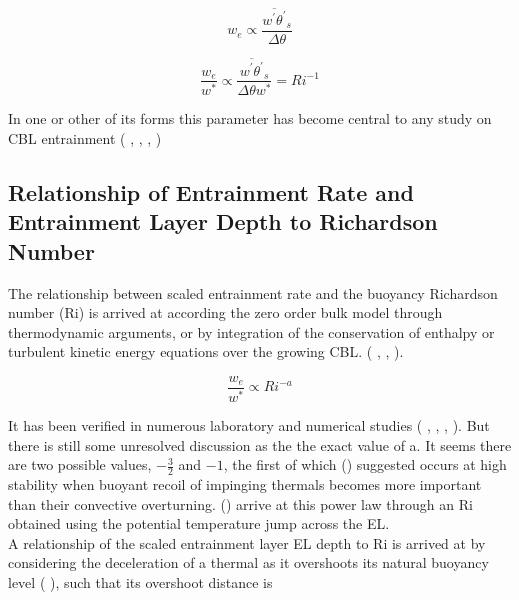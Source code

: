 \begin{equation}
w_{e} \propto \frac{\overline{w^{'}\theta^{'}}_{s}}{\Delta \theta}
\end{equation}

\begin{equation}
\frac{w_{e}}{w^{*}} \propto  \frac{\overline{w^{'}\theta^{'}}_{s}}{\Delta \theta w^{*}} = Ri^{-1}
\end{equation}
 

In one or other of its forms this parameter has become central to any study on \acs{CBL} entrainment (\citeauthor{SullMoengStev} \cite{SullMoengStev}, \citeauthor{FedConzMir04} \cite{FedConzMir04}, \citeauthor{Traum11} \cite{Traum11}, \citeauthor{BrooksFowler2} \cite{BrooksFowler2})


\subsection{Relationship of Entrainment Rate and Entrainment Layer Depth to Richardson Number}

The relationship between scaled entrainment rate and the buoyancy Richardson number (\acs{Ri}) is arrived at according the zero order bulk
model through thermodynamic arguments, or by integration of the conservation of enthalpy or turbulent kinetic energy equations
over the growing \acs{CBL}. (\citeauthor{Tennekes73} \cite{Tennekes73}, \citeauthor{Deardorff79} \cite{Deardorff79}, 
\citeauthor{FedConzMir04} \cite{FedConzMir04}). 

\begin{equation}
\frac{w_{e}}{w^{*}} \propto  Ri^{-a}
\end{equation}


It has been verified in numerous laboratory and numerical studies (\citeauthor{DearWill80} \cite{DearWill80}, \citeauthor{SullMoengStev} \cite{SullMoengStev}, \citeauthor{FedConzMir04} \cite{FedConzMir04}, \citeauthor{BrooksFowler2} \cite{BrooksFowler2}).  But there is still some 
unresolved discussion as the the exact value of a.  It seems there are two possible values, $-\frac{3}{2}$ and $-1$, the first of which \citeauthor{EllTurn} (\cite{EllTurn}) suggested occurs at high stability when buoyant recoil of impinging thermals becomes more important than their convective overturning.  \citeauthor{FedConzMir04} (\cite{FedConzMir04}) arrive at this power law through an \acs{Ri} obtained using the potential temperature jump across the \acs{EL}.\\

A relationship of the scaled entrainment layer \acs{EL} depth to \acs{Ri} is arrived at by considering the deceleration of a thermal
as it overshoots its natural buoyancy level (\citeauthor{StullNelEl} \cite{StullNelEl}), such that its overshoot distance is

